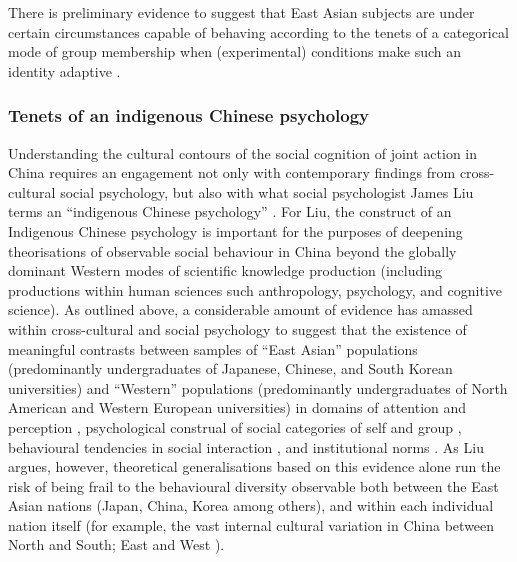 {There is preliminary evidence to suggest that East Asian subjects are under certain circumstances capable of behaving according to the tenets of a categorical mode of group membership when (experimental) conditions make such an identity adaptive \citep{Hong2000}.




\subsubsection{Tenets of an indigenous Chinese psychology}
Understanding the cultural contours of the social cognition of joint action in China requires an engagement not only with contemporary findings from cross-cultural social psychology, but also with what social psychologist James Liu terms an ``indigenous Chinese psychology'' \citep{Liu2009}. For Liu, the construct of an Indigenous Chinese psychology is important for the purposes of deepening theorisations of observable social behaviour in China beyond the globally dominant Western modes of scientific knowledge production (including productions within human sciences such anthropology, psychology, and cognitive science).  As outlined above, a considerable amount of evidence has amassed within cross-cultural and social psychology to suggest that the existence of meaningful contrasts between samples of ``East Asian'' populations (predominantly undergraduates of Japanese, Chinese, and South Korean universities) and ``Western'' populations (predominantly undergraduates of North American and Western European universities) in domains of attention and perception \citep{Peng1997,Nisbett2003}, psychological construal of social categories of self and group \citep{Markus1991}, behavioural tendencies in social interaction \citep{Yuki2003}, and institutional norms \citep{Liu2017}.  As Liu argues, however, theoretical generalisations based on this evidence alone run the risk of being frail to the behavioural diversity observable both between the East Asian nations (Japan, China, Korea among others), and within each individual nation itself (for example, the vast internal cultural variation in China between North and South; East and West \citep[see, for example,][]{Henrich2014}).

}
